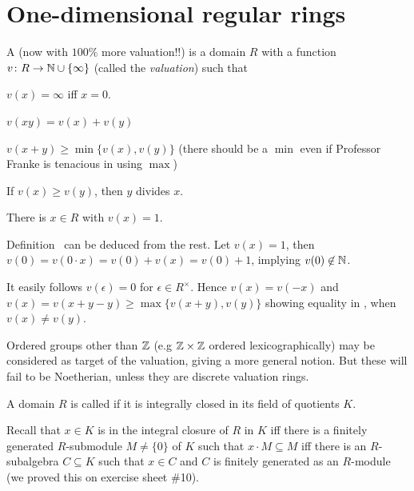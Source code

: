 \documentclass[a4paper,parskip=half,numbers=enddot, DIV=12]{scrreprt}
\begin{document}
\section{One-dimensional regular rings}

\begin{defi}
    A  (now with $100\%$ more valuation!!) is a domain $R$ with a function $v\colon R\morphism \IN\cup\{\infty\}$ (called the \emph{valuation}) such that
    \begin{alphanumerate}
    \item 
        $v(x)=\infty$ iff $x = 0$.
    \item 
        $v(xy) = v(x) + v(y)$
    \item 
        $v(x+y) \geq \min\{v(x), v(y)\}$ (there should be a $\min$ even if Professor Franke is tenacious in using $\max$)
    \item 
        If $v(x)\geq v(y)$, then $y$ divides $x$. 
    \item 
        There is $x\in R$ with $v(x) = 1$.
    \end{alphanumerate}
\end{defi}
\begin{rem}
    \begin{alphanumerate}
    \item 
        Definition~ can be deduced from the rest. Let $v(x) = 1$, then $v(0) = v(0\cdot x) = v(0) + v(x) = v(0) +1$, implying $v(0)\not \in \mathbb{N}$. 
    \item 
        It easily follows $v(\epsilon) = 0$ for $\epsilon \in R^\times$. Hence $v(x) = v(-x)$ and $v(x) = v(x+y-y) \geq \max\{v(x+y), v(y)\}$ showing equality in , when $v(x) \neq v(y)$.
    \item 
        Ordered groups other than $\mathbb{Z}$ (e.g $\mathbb{Z}\times \mathbb{Z}$ ordered lexicographically) may be considered as target of the valuation, giving a more general notion. But these will fail to be Noetherian, unless they are discrete valuation rings.
    \end{alphanumerate}
\end{rem}
\begin{defi}
    A domain $R$ is called  if it is integrally closed in its field of quotients $K$. 
\end{defi}
Recall that $x\in K$ is in the integral closure of $R$ in $K$ iff there is a finitely generated $R$-submodule $M\neq\{0\}$ of $K$ such that $x\cdot M\subseteq M$  iff there is an $R$-subalgebra $C\subseteq K$ such that $x\in C$ and $C$ is finitely generated as an $R$-module (we proved this on exercise sheet \#10).
\end{document}
